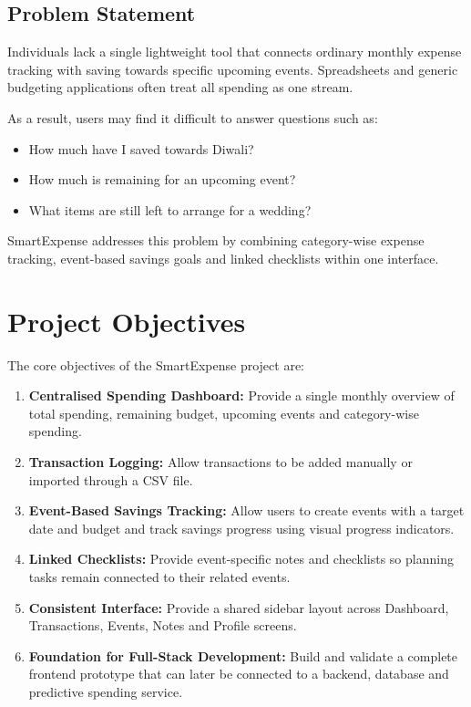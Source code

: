 \documentclass[12pt,a4paper]{report}
\begin{document}
\subsection{Problem Statement}

Individuals lack a single lightweight tool that connects ordinary monthly
expense tracking with saving towards specific upcoming events. Spreadsheets
and generic budgeting applications often treat all spending as one stream.

As a result, users may find it difficult to answer questions such as:

\begin{itemize}
    \item How much have I saved towards Diwali?
    \item How much is remaining for an upcoming event?
    \item What items are still left to arrange for a wedding?
\end{itemize}

SmartExpense addresses this problem by combining category-wise expense
tracking, event-based savings goals and linked checklists within one
interface.

\section{Project Objectives}

The core objectives of the SmartExpense project are:

\begin{enumerate}
    \item \textbf{Centralised Spending Dashboard:} Provide a single monthly
    overview of total spending, remaining budget, upcoming events and
    category-wise spending.

    \item \textbf{Transaction Logging:} Allow transactions to be added
    manually or imported through a CSV file.

    \item \textbf{Event-Based Savings Tracking:} Allow users to create
    events with a target date and budget and track savings progress using
    visual progress indicators.

    \item \textbf{Linked Checklists:} Provide event-specific notes and
    checklists so planning tasks remain connected to their related events.

    \item \textbf{Consistent Interface:} Provide a shared sidebar layout
    across Dashboard, Transactions, Events, Notes and Profile screens.

    \item \textbf{Foundation for Full-Stack Development:} Build and validate
    a complete frontend prototype that can later be connected to a backend,
    database and predictive spending service.
\end{enumerate}
\end{document}
